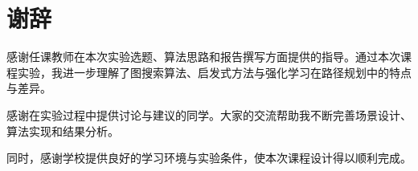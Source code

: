 \chapter*{谢辞}

感谢任课教师在本次实验选题、算法思路和报告撰写方面提供的指导。通过本次课程实验，我进一步理解了图搜索算法、启发式方法与强化学习在路径规划中的特点与差异。

感谢在实验过程中提供讨论与建议的同学。大家的交流帮助我不断完善场景设计、算法实现和结果分析。

同时，感谢学校提供良好的学习环境与实验条件，使本次课程设计得以顺利完成。
